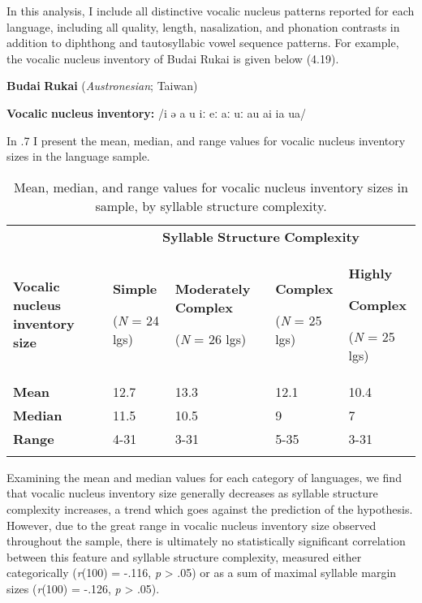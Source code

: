   In this analysis, I include all distinctive vocalic nucleus patterns reported for each language, including all quality, length, nasalization, and phonation contrasts in addition to diphthong and tautosyllabic vowel sequence patterns. For example, the vocalic nucleus inventory of Budai Rukai is given below (4.19).

\ea\label{ex:(4.19)}
   \textbf{Budai} \textbf{Rukai} (\textit{Austronesian}; Taiwan)

\textbf{Vocalic} \textbf{nucleus} \textbf{inventory:} /i ə a u iː eː aː uː au ai ia ua/

  In .7 I present the mean, median, and range values for vocalic nucleus inventory sizes in the language sample.

\begin{table}
\begin{tabularx}{\textwidth}{XXXXX}
 & \multicolumn{4}{c}{ \textbf{Syllable} \textbf{Structure} \textbf{Complexity}}\\
\lsptoprule
\textbf{Vocalic} \textbf{nucleus} \textbf{inventory} \textbf{size} & { \textbf{Simple}}

 (\textit{N} = 24 lgs) & { \textbf{Moderately} \textbf{Complex}}

 (\textit{N} = 26 lgs) & { \textbf{Complex}}

 (\textit{N} = 25 lgs) & { \textbf{Highly} }

{ \textbf{Complex}}

 (\textit{N} = 25 lgs)\\
\textbf{Mean} & 12.7 & 13.3 & 12.1 & 10.4\\
\textbf{Median} & 11.5 & 10.5 & 9 & 7\\
\textbf{Range} & 4-31 & 3-31 & 5-35 & 3-31\\
\lspbottomrule
\end{tabularx}
\caption{\label{4.7}Mean, median, and range values for vocalic nucleus inventory sizes in sample, by syllable structure complexity.}
\end{table}

\z

  Examining the mean and median values for each category of languages, we find that vocalic nucleus inventory size generally decreases as syllable structure complexity increases, a trend which goes against the prediction of the hypothesis. However, due to the great range in vocalic nucleus inventory size observed throughout the sample, there is ultimately no statistically significant correlation between this feature and syllable structure complexity, measured either categorically (\textit{r}(100) = -.116, \textit{p} > .05) or as a sum of maximal syllable margin sizes (\textit{r}(100) = -.126, \textit{p} > .05). 

